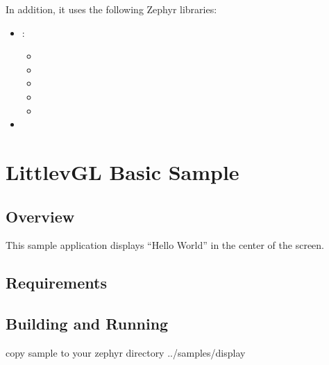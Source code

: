 \documentclass[letterpaper,10pt,english]{sphinxmanual}
\begin{document}
In addition, it uses the following Zephyr libraries:
\begin{itemize}
\item {} 
:
\begin{itemize}
\item {} 

\item {} 

\item {} 

\item {} 

\item {} 

\end{itemize}

\item {} 

\end{itemize}


\section{LittlevGL Basic Sample}
\label{\detokenize{samples/lvgl2/README:littlevgl-basic-sample}}\label{\detokenize{samples/lvgl2/README:lvgl-sample}}\label{\detokenize{samples/lvgl2/README::doc}}

\subsection{Overview}
\label{\detokenize{samples/lvgl2/README:overview}}
This sample application displays “Hello World” in the center of the screen.


\subsection{Requirements}
\label{\detokenize{samples/lvgl2/README:requirements}}

\subsection{Building and Running}
\label{\detokenize{samples/lvgl2/README:building-and-running}}
copy sample to your zephyr directory ../samples/display
\end{document}
